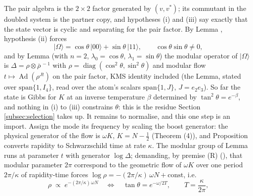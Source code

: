 The pair algebra is the $2 \times 2$ factor generated by $(v, v^*)$; its commutant in the doubled system is the partner copy, and hypotheses (i) and (iii) say exactly that the state vector is cyclic and separating for the pair factor. By Lemma , hypothesis (ii) forces
\[
|\Omega\rangle = \cos\theta\,|00\rangle + \sin\theta\,|11\rangle, \qquad \cos\theta\sin\theta \neq 0 ,
\]
and by Lemma  (with $n = 2$, $\lambda_0 = \cos\theta$, $\lambda_1 = \sin\theta$) the modular operator of $|\Omega\rangle$ is $\Delta = \rho \otimes \bar\rho^{\,-1}$ with $\rho = \operatorname{diag}(\cos^2\theta, \sin^2\theta)$ and modular flow $t \mapsto \operatorname{Ad}(\rho^{Jt})$ on the pair factor, KMS identity included (the Lemma, stated over $\mathrm{span}\{1, I_4\}$, read over the atom's scalars $\mathrm{span}\{1, J\}$, $J = e_2e_3$). So far the state is Gibbs for $K$ at an inverse temperature $\beta$ determined by $\tan^{2}\theta = e^{-\beta}$, and nothing in (i) to (iii) constrains $\theta$: this is the residue Section \ref{subsec:selection} takes up. It remains to normalise, and this one step is an import. Assign the mode its frequency by scaling the boost generator: the physical generator of the flow is $\omega K$, $K = N - \tfrac12$ (Theorem (4)), and Proposition  converts rapidity to Schwarzschild time at rate $\kappa$. The modular group of Lemma  runs at parameter $t$ with generator $\log\Delta$; demanding, by premise (R) (), that modular parameter $2\pi$ correspond to the geometric flow of $\omega K$ over one period $2\pi/\kappa$ of rapidity-time forces $\log\rho = -(2\pi/\kappa)\,\omega N + \text{const}$, i.e.
\[
\rho \;\propto\; e^{-(2\pi/\kappa)\,\omega N}
\quad\Longleftrightarrow\quad
\tan\theta = e^{-\omega/2T}, \qquad T = \frac{\kappa}{2\pi} ,
\]
